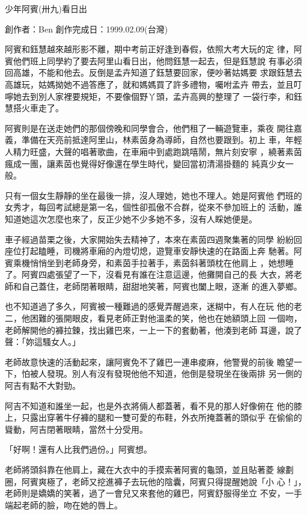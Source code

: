 



少年阿賓(卅九)看日出

創作者：Ben
創作完成日：1999.02.09(台灣)


阿賓和鈺慧越來越形影不離，期中考前正好逢到春假，依照大考大玩的定
律，阿賓他們班上同學約了要去阿里山看日出，他問鈺慧一起去，但是鈺慧說
有事必須回高雄，不能和他去。反倒是孟卉知道了鈺慧要回家，便吵著姑媽要
求跟鈺慧去高雄玩，姑媽拗她不過答應了，就和媽媽買了許多禮物，囑咐孟卉
帶去，並且叮嚀她去到別人家裡要規矩，不要像個野丫頭，孟卉高興的整理了
一袋行李，和鈺慧搭火車走了。

阿賓則是在送走她們的那個傍晚和同學會合，他們租了一輛遊覽車，乘夜
開往嘉義，準備在天亮前抵達阿里山，林素茵身為導師，自然也要跟到。初上
車，年輕人精力旺盛，大聲的唱著歌曲，在車廂中到處跑跳嘻鬧，無片刻安寧
，繞著素茵瘋成一團，讓素茵也覺得好像還在學生時代，變回當初清湯掛麵的
純真少女一般。

只有一個女生靜靜的坐在最後一排，沒人理她，她也不理人。她是阿賓他
們班的女秀才，每回考試總是第一名，個性卻孤傲不合群，從來不參加班上的
活動，誰知道她這次怎麼也來了，反正少她不少多她不多，沒有人睬她便是。

車子經過苗栗之後，大家開始失去精神了，本來在素茵四週聚集著的同學
紛紛回座位打起瞌睡，司機將車廂的內燈切熄，遊覽車安靜快速的在路面上奔
馳著。阿賓乘機悄悄坐到老師身旁，和素茵手拉著手，素茵斜著頭枕在他肩上
，她想睡了。阿賓四處張望了一下，沒看見有誰在注意這邊，他攤開自己的長
大衣，將老師和自己蓋住，老師閉著眼睛，甜甜地笑著，阿賓也闔上眼，逐漸
的進入夢鄉。

也不知道過了多久，阿賓被一種難過的感覺弄醒過來，迷糊中，有人在玩
他的老二，他困難的張開眼皮，看見老師正對他溫柔的笑，他也在她額頭上回
一個吻，老師解開他的褲拉鍊，找出雞巴來，一上一下的套動著，他湊到老師
耳邊，說了聲：「妳這騷女人。」

老師故意快速的活動起來，讓阿賓免不了雞巴一連串痠麻，他警覺的前後
瞻望一下，怕被人發現。別人有沒有發現他他不知道，他倒是發現坐在後兩排
另一側的阿吉有點不大對勁。

阿吉不知道和誰坐一起，也是外衣將倆人都蓋著，看不見的那人好像俯在
他的膝上，只露出穿著牛仔褲的腿和一雙可愛的布鞋，外衣所掩蓋著的頭似乎
在偷偷的聳動，阿吉閉著眼睛，當然十分受用。

「好啊！還有人比我們過份。」阿賓想。

老師將頭斜靠在他肩上，藏在大衣中的手摸索著阿賓的龜頭，並且貼著菱
線劃圈，阿賓爽極了，老師又挖進褲子去玩他的陰囊，阿賓只得提醒她說「小
心！」，老師則是嬌嬌的笑著，過了一會兒又來套他的雞巴，阿賓舒服得坐立
不安，一手端起老師的臉，吻在她的唇上。

